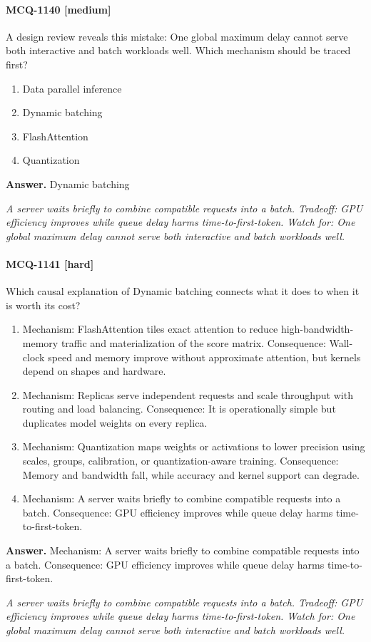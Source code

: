 \paragraph{MCQ-1140 [medium]} A design review reveals this mistake: One global maximum delay cannot serve both interactive and batch workloads well. Which mechanism should be traced first?
\begin{enumerate}[label=\Alph*.]
\item Data parallel inference
\item Dynamic batching
\item FlashAttention
\item Quantization
\end{enumerate}
\noindent\textbf{Answer.} Dynamic batching
\par\textit{A server waits briefly to combine compatible requests into a batch. Tradeoff: GPU efficiency improves while queue delay harms time-to-first-token. Watch for: One global maximum delay cannot serve both interactive and batch workloads well.}
\paragraph{MCQ-1141 [hard]} Which causal explanation of Dynamic batching connects what it does to when it is worth its cost?
\begin{enumerate}[label=\Alph*.]
\item Mechanism: FlashAttention tiles exact attention to reduce high-bandwidth-memory traffic and materialization of the score matrix. Consequence: Wall-clock speed and memory improve without approximate attention, but kernels depend on shapes and hardware.
\item Mechanism: Replicas serve independent requests and scale throughput with routing and load balancing. Consequence: It is operationally simple but duplicates model weights on every replica.
\item Mechanism: Quantization maps weights or activations to lower precision using scales, groups, calibration, or quantization-aware training. Consequence: Memory and bandwidth fall, while accuracy and kernel support can degrade.
\item Mechanism: A server waits briefly to combine compatible requests into a batch. Consequence: GPU efficiency improves while queue delay harms time-to-first-token.
\end{enumerate}
\noindent\textbf{Answer.} Mechanism: A server waits briefly to combine compatible requests into a batch. Consequence: GPU efficiency improves while queue delay harms time-to-first-token.
\par\textit{A server waits briefly to combine compatible requests into a batch. Tradeoff: GPU efficiency improves while queue delay harms time-to-first-token. Watch for: One global maximum delay cannot serve both interactive and batch workloads well.}
